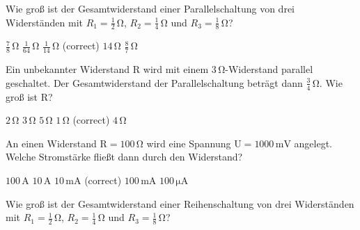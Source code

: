 \documentclass[11pt]{exam}
\begin{document}
\setlength{\voffset}{-0.5in}
\setlength{\headsep}{5pt}

\hspace{2mm}
 \hspace{5mm}
\vspace{4mm}

\begin{questions}

\question Wie groß ist der Gesamtwiderstand einer Parallelschaltung von drei Widerständen mit \(R_1=\mathrm{\frac{1}{2}\,\Omega}\), \(R_2=\mathrm{\frac{1}{4}\,\Omega}\) und \(R_3=\mathrm{\frac{1}{8}\,\Omega}\)?

\begin{choices}
	\choice \(\mathrm{\frac{7}{8}\,\Omega}\)
	\choice \(\mathrm{\frac{1}{64}\,\Omega}\)
	\choice \(\mathrm{\frac{1}{14}\,\Omega}\) (correct)
	\choice \(\mathrm{14\,\Omega}\)
	\choice \(\mathrm{\frac{8}{7}\,\Omega}\)
\end{choices}

\vspace{3mm}\question Ein unbekannter Widerstand \(\mathrm{R}\) wird mit einem \(\mathrm{3\,\Omega}\)-Widerstand parallel geschaltet. Der Gesamtwiderstand der Parallelschaltung beträgt dann \(\mathrm{\frac{3}{4}\,\Omega}\). Wie groß ist \(\mathrm{R}\)?

\begin{choices}
	\choice \(\mathrm{2\,\Omega}\)
	\choice \(\mathrm{3\,\Omega}\)
	\choice \(\mathrm{5\,\Omega}\)
	\choice \(\mathrm{1\,\Omega}\) (correct)
	\choice \(\mathrm{4\,\Omega}\)
\end{choices}

\vspace{3mm}\question An einen Widerstand \(\mathrm{R=100\,\Omega}\) wird eine Spannung \(\mathrm{U=1000\,mV}\) angelegt. Welche Stromstärke fließt dann durch den Widerstand?

\begin{choices}
	\choice \(\mathrm{100\,A}\)
	\choice \(\mathrm{10\,A}\)
	\choice \(\mathrm{10\,mA}\) (correct)
	\choice \(\mathrm{100\,mA}\)
	\choice \(\mathrm{100\,\mu A}\)
\end{choices}

\vspace{3mm}\question Wie groß ist der Gesamtwiderstand einer Reihenschaltung von drei Widerständen mit \(R_1=\mathrm{\frac{1}{2}\,\Omega}\), \(R_2=\mathrm{\frac{1}{4}\,\Omega}\) und \(R_3=\mathrm{\frac{1}{8}\,\Omega}\)?


\end{questions}
\end{document}
